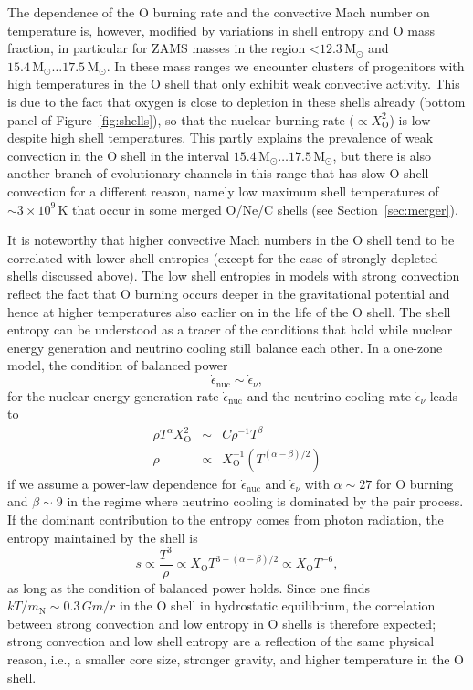 \documentclass[useAMS,usenatbib]{mnras}
\newcommand{\Msun}{\ensuremath{\mathrm{M}_\odot}}
\begin{document}
The dependence of the O burning rate and the convective Mach number on temperature is, however, modified by variations in shell entropy and O mass fraction, in particular for ZAMS masses in the region $\mathord{<}12.3\,\Msun$ and $15.4\,\Msun \ldots 17.5\,\Msun$.  In these mass ranges we encounter clusters of progenitors with high temperatures in the O shell that only exhibit weak convective activity.  This is due to the fact that oxygen is close to depletion in these shells already (bottom panel of Figure~\ref{fig:shells}), so that the nuclear burning rate ($\propto X_\mathrm{O}^2$) is low despite high shell temperatures.  This partly explains the prevalence of weak convection in the O shell in the interval $15.4\,\Msun\ldots 17.5\,\Msun$, but there is also another branch of evolutionary channels in this range that has slow O shell convection for a different reason, namely low maximum shell temperatures of $\mathord{\sim} 3 \times 10^9 \,\mathrm{K} $ that occur in some merged O/Ne/C shells (see Section~\ref{sec:merger}).  

It is noteworthy that higher convective Mach numbers in the O shell tend to be correlated with lower shell entropies (except for the case of strongly depleted shells discussed above).  The low shell entropies in models with strong convection reflect the fact that O burning occurs deeper in the gravitational potential and hence at higher temperatures also earlier on in the life of the O shell.  The shell entropy can be understood as a tracer of the conditions that hold while nuclear energy generation and neutrino cooling still balance each other.  In a one-zone model, the condition of balanced power \citep{woosley_72}
\begin{equation}
\dot{\epsilon}_\mathrm{nuc} \sim \dot{\epsilon}_\nu,
\end{equation}
for the nuclear energy generation
rate 
$\dot{\epsilon}_\mathrm{nuc}$ and the neutrino 
cooling rate $\dot{\epsilon}_\nu$
leads to 
\begin{eqnarray}
\rho T^{\alpha} X_\mathrm{O}^2 &\sim& C \rho^{-1} T^\beta \\
\rho &\propto& X_\mathrm{O}^{-1} (T^{(\alpha-\beta)/2})
\end{eqnarray}
if we assume a power-law dependence for
$\dot{\epsilon}_\mathrm{nuc}$ and  $\dot{\epsilon}_\nu$
with $\alpha \sim 27$ for O burning and $\beta \sim 9$
in the regime where neutrino cooling is dominated by
the pair process. If the dominant contribution
to the entropy comes from photon radiation,
the entropy maintained by the shell is
\begin{equation}
s \propto \frac{T^3}{\rho}
\propto X_\mathrm{O} T^{3-(\alpha-\beta)/2}
\propto X_\mathrm{O} T^{-6},
\end{equation}
as long as the condition of balanced power holds.
Since one finds $k T/m_\mathrm{N}\mathrm{\sim} 0.3\,Gm/r$ 
in the O shell in hydrostatic equilibrium,
 the correlation between strong convection and
low entropy in O shells is therefore expected;
strong convection and low shell entropy are a reflection
of the same physical reason, i.e., a smaller core
size, stronger gravity, and higher temperature 
in the O shell.
\end{document}
